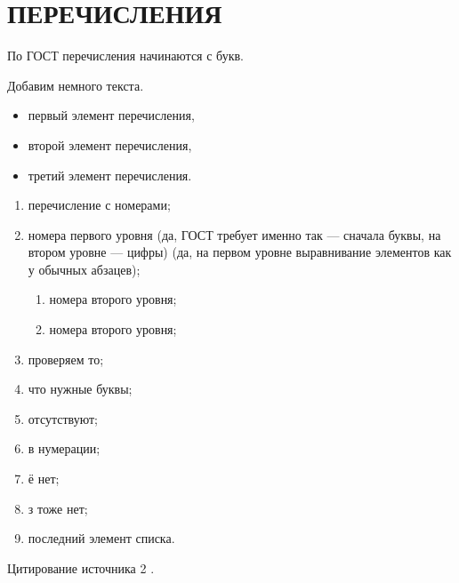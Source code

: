\section{ПЕРЕЧИСЛЕНИЯ}

По ГОСТ перечисления начинаются с букв.

Добавим немного текста. \lipsum[1][1]

\begin{itemize}
    \item первый элемент перечисления,
    \item второй элемент перечисления,
    \item третий элемент перечисления.
\end{itemize}

\lipsum[1][1]

\begin{enumerate}
    \item перечисление с номерами;
    \item номера первого уровня (да, ГОСТ требует именно так --- сначала буквы, 
    на втором уровне --- цифры)
    (да, на первом уровне выравнивание элементов как у обычных абзацев);
        \begin{enumerate}
            \item номера второго уровня;
            \item номера второго уровня;
        \end{enumerate}
    \item проверяем то;
    \item что нужные буквы;
    \item отсутствуют;
    \item в нумерации;
    \item ё нет;
    \item з тоже нет;
    \item последний элемент списка.
\end{enumerate}

Цитирование источника 2 \cite{Article3}.
